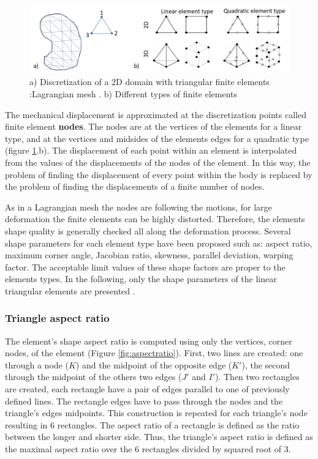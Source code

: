 \begin{figure}[!h]
\centering
\includegraphics[width=1\textwidth,keepaspectratio]{figures/discretization.jpg} 
\caption{a) Discretization of  a 2D domain with triangular finite elements :Lagrangian mesh . b) Different types of finite elements}
\label{discretization}
\end{figure}

 The mechanical displacement is approximated at the discretization points called finite element \textbf{nodes}. The nodes are at the vertices of the elements for a linear type, and at the vertices and midsides of the elements edges for a quadratic type (figure \ref{discretization}.b). The displacement of each point within an element is interpolated from the values of the displacements of the nodes of the element. In this way, the problem of finding the displacement of every point within the body is replaced by the problem of finding the displacements of a finite number of nodes.
 
 As in a Lagrangian mesh the nodes are following the motions, for large deformation the finite elements can be highly distorted. Therefore, the elements shape quality is generally checked all along the deformation process. Several shape parameters for each element type have been proposed such as: aspect ratio, maximum corner angle, Jacobian ratio, skewness, parallel deviation, warping factor. The acceptable limit values of these shape factors are proper to the elements types.
In the following, only the shape parameters of the linear triangular elements are presented \citep{ansys_theory_2017}.  
 \subsubsection*{Triangle aspect ratio }
 The element's shape aspect ratio is computed using only the vertices, corner nodes, of the element (Figure \ref{fig:aspectratio}). First, two lines are created: one through a node ($K$) and the midpoint of the opposite edge ($ K'$), the second through the midpoint of the others two edges ($J'$ and $ I'$). Then two rectangles are created, each rectangle have a pair of edges parallel to one of previously defined lines. The rectangle edges have to pass through the nodes and the triangle's edges midpoints. This construction is repeated for each triangle's node resulting in 6 rectangles. The aspect ratio of a rectangle is defined as the ratio between the longer and shorter side. Thus, the triangle's aspect ratio is defined as the maximal aspect ratio over the 6 rectangles divided by squared root of 3. 
 
